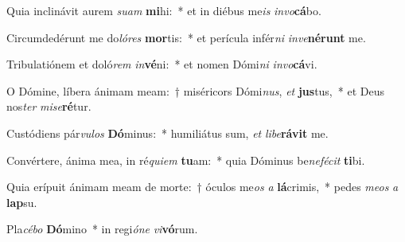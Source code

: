 \item Quia inclinávit aurem \textit{su}\textit{am} \textbf{mi}hi:~* et in diébus me\textit{is} \textit{in}\textit{vo}\textbf{cá}bo.
\item Circumdedérunt me do\textit{ló}\textit{res} \textbf{mor}tis:~* et perícula infér\textit{ni} \textit{in}\textit{ve}\textbf{né}\textbf{runt} me.
\item Tribulatiónem et doló\textit{rem} \textit{in}\textbf{vé}ni:~* et nomen Dómi\textit{ni} \textit{in}\textit{vo}\textbf{cá}vi.
\item O Dómine, líbera ánimam meam:~† miséricors Dómi\textit{nus}, \textit{et} \textbf{jus}tus,~* et Deus nos\textit{ter} \textit{mi}\textit{se}\textbf{ré}tur.
\item Custódiens pár\textit{vu}\textit{los} \textbf{Dó}minus:~* humiliátus sum, \textit{et} \textit{li}\textit{be}\textbf{rá}\textbf{vit} me.
\item Convértere, ánima mea, in ré\textit{qui}\textit{em} \textbf{tu}am:~* quia Dóminus be\textit{ne}\textit{fé}\textit{cit} \textbf{ti}bi.
\item Quia erípuit ánimam meam de morte:~† óculos me\textit{os} \textit{a} \textbf{lá}crimis,~* pedes \textit{me}\textit{os} \textit{a} \textbf{lap}su.
\item Pla\textit{cé}\textit{bo} \textbf{Dó}mino~* in regi\textit{ó}\textit{ne} \textit{vi}\textbf{vó}rum.
